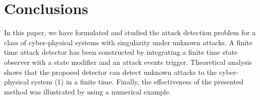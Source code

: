 \documentclass[english]{cccconf}
\theoremstyle{definition}
\begin{document}
\section{Conclusions}
In this paper, we have formulated and studied the attack detection problem for a class of cyber-physical systems with singularity under unknown attacks. A finite time attack detector has been constructed by integrating a finite time state observer with a state modifier and an attack events trigger. Theoretical analysis shows that the proposed detector can detect unknown attacks to the cyber-physical system (1) in a finite time. Finally, the effectiveness of the presented method was illustrated by using a numerical example.



\end{document}
